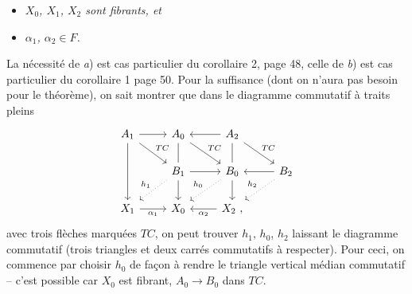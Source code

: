 \begin{itemize}[leftmargin=3em]
\item[a)] \textit{$X_0$, $X_1$, $X_2$ sont fibrants, et}
\item[b)] \textit{$\alpha_1$, $\alpha_2 \in F$.}
\end{itemize}

La nécessité de \textit{a}) est cas particulier du corollaire 2, page 48, celle de \textit{b}) est cas particulier du corollaire 1 page 50. Pour la suffisance (dont on n'aura pas besoin pour le théorème), on sait montrer que dans le diagramme commutatif à traits pleins
\[
\begin{tikzcd}
A_1 \arrow[r] \arrow[dr, "TC"] \arrow[dd] & A_0 \arrow[dr, "TC"] \arrow[d, dash] & A_2 \arrow[l] \arrow[dr, "TC"] \arrow[d, dash] & \\
 & B_1 \arrow[r] \arrow[dl, dotted, "h_1"'] \arrow[d] & B_0 \arrow[dl, dotted, "h_0"'] \arrow[d] & B_2 \arrow[l] \arrow[dl, dotted, "h_2"'] \\
X_1 \arrow[r, "\alpha_1"'] & X_0 & X_2 \ , \arrow[l, "\alpha_2"] &
\end{tikzcd}
\]
avec trois flèches marquées $TC$, on peut trouver $h_1$, $h_0$, $h_2$ laissant le diagramme commutatif (trois triangles et deux carrés commutatifs à respecter). Pour ceci, on commence par choisir $h_0$ de façon à rendre le triangle vertical médian commutatif -- c'est possible car $X_0$ est fibrant, $A_0 \longrightarrow B_0$ dans $TC$.


